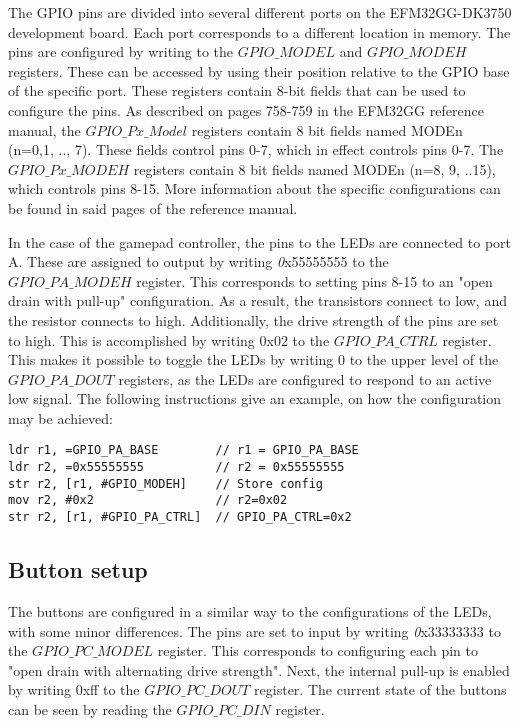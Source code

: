 The GPIO pins are divided into several different ports on the EFM32GG-DK3750 development board. Each port corresponds to a different location in memory.  The pins are configured by writing to the $GPIO\_MODEL$ and $GPIO\_MODEH$ registers. These can be accessed by using their position relative to the GPIO base of the specific port. These registers contain 8-bit fields that can be used to configure the pins. As described on pages 758-759 in the EFM32GG reference manual, the $GPIO\_Px\_Model$ registers contain 8 bit fields named MODEn (n=0,1, .., 7). These fields control pins 0-7, which in effect controls pins 0-7. The $GPIO\_Px\_MODEH$ registers contain 8 bit fields named MODEn (n=8, 9, ..15), which controls pins 8-15. More information about the specific configurations can be found in said pages of the reference manual.

In the case of the gamepad controller, the pins to the LEDs are connected to port A. These are assigned to output by writing {\emph 0x55555555} to  the $GPIO\_PA\_MODEH$ register. This corresponds to setting pins 8-15 to an "open drain with pull-up" configuration\cite[p.758-759]{EFM32GG-rm}. As a result, the transistors connect to low, and the resistor connects to high. Additionally, the drive strength of the pins are set to high. This is accomplished by writing 0x02 to the $GPIO\_PA\_CTRL$ register. This makes it possible to toggle the LEDs by writing 0 to the upper level of the $GPIO\_PA\_DOUT$ registers, as the LEDs are configured to respond to an active low signal. The following instructions give an example, on how the configuration may be achieved:


\begin{lstlisting}
ldr r1, =GPIO_PA_BASE        // r1 = GPIO_PA_BASE
ldr r2, =0x55555555          // r2 = 0x55555555  
str r2, [r1, #GPIO_MODEH]    // Store config
mov r2, #0x2                 // r2=0x02
str r2, [r1, #GPIO_PA_CTRL]  // GPIO_PA_CTRL=0x2                    

\end{lstlisting}



\subsection{Button setup}\label{ch:buttons}
The buttons are configured in a similar way to the configurations of the LEDs, with some minor differences. The pins are set to input by writing {\emph 0x33333333} to the $GPIO\_PC\_MODEL$ register. This corresponds to configuring each pin to "open drain with alternating drive strength"\cite[p.758-759]{EFM32GG-rm}. Next, the internal pull-up is enabled by writing 0xff to the $GPIO\_PC\_DOUT$ register. The current state of the buttons can be seen by reading the $GPIO\_PC\_DIN$ register. 

